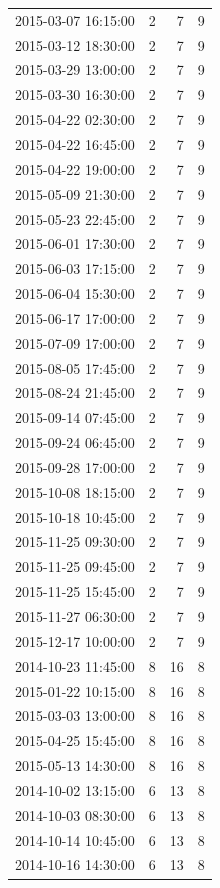 \begin{tabular}{lrrr}
2015-03-07 16:15:00 & 2 & 7 & 9 \\
2015-03-12 18:30:00 & 2 & 7 & 9 \\
2015-03-29 13:00:00 & 2 & 7 & 9 \\
2015-03-30 16:30:00 & 2 & 7 & 9 \\
2015-04-22 02:30:00 & 2 & 7 & 9 \\
2015-04-22 16:45:00 & 2 & 7 & 9 \\
2015-04-22 19:00:00 & 2 & 7 & 9 \\
2015-05-09 21:30:00 & 2 & 7 & 9 \\
2015-05-23 22:45:00 & 2 & 7 & 9 \\
2015-06-01 17:30:00 & 2 & 7 & 9 \\
2015-06-03 17:15:00 & 2 & 7 & 9 \\
2015-06-04 15:30:00 & 2 & 7 & 9 \\
2015-06-17 17:00:00 & 2 & 7 & 9 \\
2015-07-09 17:00:00 & 2 & 7 & 9 \\
2015-08-05 17:45:00 & 2 & 7 & 9 \\
2015-08-24 21:45:00 & 2 & 7 & 9 \\
2015-09-14 07:45:00 & 2 & 7 & 9 \\
2015-09-24 06:45:00 & 2 & 7 & 9 \\
2015-09-28 17:00:00 & 2 & 7 & 9 \\
2015-10-08 18:15:00 & 2 & 7 & 9 \\
2015-10-18 10:45:00 & 2 & 7 & 9 \\
2015-11-25 09:30:00 & 2 & 7 & 9 \\
2015-11-25 09:45:00 & 2 & 7 & 9 \\
2015-11-25 15:45:00 & 2 & 7 & 9 \\
2015-11-27 06:30:00 & 2 & 7 & 9 \\
2015-12-17 10:00:00 & 2 & 7 & 9 \\
2014-10-23 11:45:00 & 8 & 16 & 8 \\
2015-01-22 10:15:00 & 8 & 16 & 8 \\
2015-03-03 13:00:00 & 8 & 16 & 8 \\
2015-04-25 15:45:00 & 8 & 16 & 8 \\
2015-05-13 14:30:00 & 8 & 16 & 8 \\
2014-10-02 13:15:00 & 6 & 13 & 8 \\
2014-10-03 08:30:00 & 6 & 13 & 8 \\
2014-10-14 10:45:00 & 6 & 13 & 8 \\
2014-10-16 14:30:00 & 6 & 13 & 8 \\

\end{tabular}
